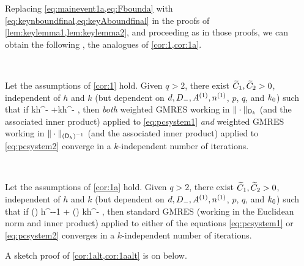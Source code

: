 Replacing \cref{eq:mainevent1a,eq:Fbounda} with \cref{eq:keynboundfinal,eq:keyAboundfinal} in the proofs of \cref{lem:keylemma1,lem:keylemma2}, and proceeding as in those proofs, we can obtain the following , the analogues of \cref{cor:1,cor:1a}.

\label{cor:1alt}

\

\noindent Let the assumptions of \cref{cor:1} hold.  Given $q >2$, there exist $\widetilde{C}_{1}, \widetilde{C}_{2}>0$, independent of $h$ and $k$ (but dependent on $d, D_{-}, {A}^{(1)}, {n}^{(1)}$, $p$, $q$, and $k_{0}$) such that if 
\beq\label{eq:condalt}
\Cotilde kh^{-} \NLqDop{\Aso-\Ast} +\Cttilde  kh^{-} \NLqDRR{\nso-\nst},
\leq {}
\eeq
then \emph{both} weighted GMRES working in $\|\cdot\|_{\mathsf{D}_k}$ (and the associated inner product) applied to \cref{eq:pcsystem1} \emph{and} weighted GMRES working in $\|\cdot\|_{(\mathsf{D}_k)^{-1}}$ (and the associated inner product) applied to \cref{eq:pcsystem2}  converge in a $k$-independent number of iterations.
\enth

\label{cor:1aalt}

\

\noindent Let the assumptions of \cref{cor:1a} hold.  Given $q >2$, there exist $\widetilde{C}_{1}, \widetilde{C}_{2}>0$, independent of $h$ and $k$ (but dependent on $d, D_{-}, {A}^{(1)}, {n}^{(1)}$, $p$, $q$, and $k_{0}$) such that if
\beq\label{eq:condaalt}
\Cotilde \mleft(\frac{\splus}{\mminus}\mright) h^{--1} \NLqDop{\Aso-\Ast} + \Cttilde \mleft(\frac{\mplus}{\mminus}\mright) kh^{-} \NLqDRR{\nso-\nst} \leq \half,
\eeq
then standard GMRES (working in the Euclidean norm and inner product) applied to either of the equations \cref{eq:pcsystem1} or \cref{eq:pcsystem2}
 converges in a $k$-independent number of iterations.
 \enth

 A sketch proof of \cref{cor:1alt,cor:1aalt} is on  below.

